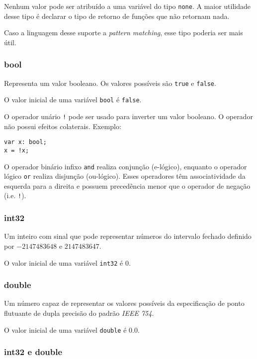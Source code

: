 \documentclass[12pt, a4paper]{article}
\begin{document}
Nenhum valor pode ser atribuído a uma variável do tipo \texttt{none}. A maior
utilidade desse tipo é declarar o tipo de retorno de funções que não retornam
nada.

Caso a linguagem desse suporte a \emph{pattern matching}, esse tipo poderia ser
mais útil.

\subsubsection{bool}

Representa um valor booleano. Os valores possíveis são \texttt{true} e
\texttt{false}.

O valor inicial de uma variável \texttt{bool} é \texttt{false}.

O operador unário \texttt{!} pode ser usado para inverter um valor
booleano. O operador não possui efeitos colaterais. Exemplo:

\begin{verbatim}
var x: bool;
x = !x;
\end{verbatim}

O operador binário infixo \texttt{and} realiza conjunção (e-lógico), enquanto o
operador lógico \texttt{or} realiza disjunção (ou-lógico). Esses operadores têm
associatividade da esquerda para a direita e possuem precedência menor que o
operador de negação (i.e. \texttt{!}).

\subsubsection{int32}

Um inteiro com sinal que pode representar números do intervalo fechado definido
por $-2147483648$ e $2147483647$.

O valor inicial de uma variável \texttt{int32} é $0$.

\subsubsection{double}

Um número capaz de representar os valores possíveis da especificação de ponto
flutuante de dupla precisão do padrão \emph{IEEE 754}.

O valor inicial de uma variável \texttt{double} é $0.0$.

\subsubsection{int32 e double}
\end{document}
